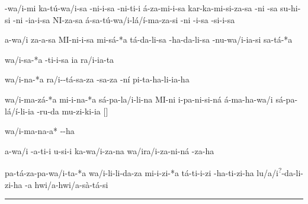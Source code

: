 \setcounter{parcount}{0}
\begin{parnumbersa}[]

	\raggedright%
	\itshape%

	-wa/i-mi \spac{}ka-tú-wa/i-sa -ni-i-sa
	-ni-ti-i á-za-mi-i-sa
	kar-ka-mi-si-za-sa \lmasc{}-ni -sa
	\spac{}su-hi-si \lmasc{}-ni -ia-i-sa
	\lmasc{}NI-za-sa \spac{}á-sa-tú-wa/i-lá/í-ma-za-si -ni -i-sa \lmasc{}-si-i-sa

	a-wa/i za-a-sa MI-ni-i-sa mi-sá-*a \lmasc{}tá-da-li-sa
	-ha-da-li-sa \lbreak{} \spac{}-nu-wa/i-ia-si sa-tá-*a

	wa/i-sa-*a -ti-i-sa \lmasc{} ia\logo{+} ra/i-ia-ta

	wa/i-na-*a \spac{}ra/i--tá-sa-za \lmasc{}-sa-za -ní \lmasc{}pi-ta-ha-li-ia-ha

	wa/i-ma-zá-*a mi-i-na-*a \lmasc{}sá-pa-la/i-li-na \lmasc{}MI-ni i-pa-ni-si-ná \lmasc{}á-ma-ha-wa/i \lmasc{}sá-pa-lá/í-li-ia -ru-da mu-zi-ki-ia \lmasc{}$[$\logo{\ldots{}}$]$ \lbreak{}

	wa/i-ma-na-a* \lmasc{}--ha

	a-wa/i \lmasc{}-a-ti-i \lmasc{}u-si-i
	ka-wa/i-za-na \lmasc{}wa/i\logo{+}ra/i-za-ni-ná
	\lmasc{}-za-ha

	pa-tá-za-pa-wa/i-ta-*a wa/i-li-li-da-za mi-i-zi-*a
	\lmasc{}tá-ti-i-zi -ha-ti-zi-ha
	\lmasc{}lu/a/i\textsuperscript{?}-da-li-zi-ha
	\lmasc{}-a hwi/a-hwi/a-sà-tá-si


\end{parnumbersa}

\vspace{10pt}
\hrule
\vspace{10pt}


